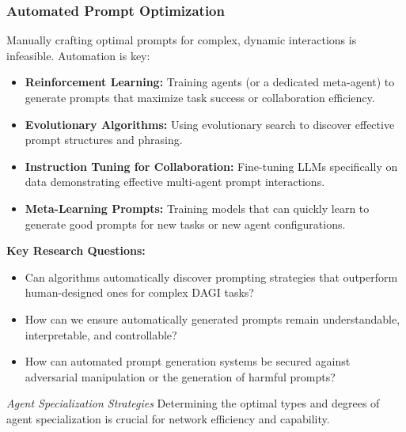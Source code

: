 \documentclass[12pt]{amsart}
\begin{document}
\subsubsection{Automated Prompt Optimization}
\label{subsubsec:automated_prompting}
Manually crafting optimal prompts for complex, dynamic interactions is infeasible. Automation is key:
\begin{itemize}[leftmargin=*]
    \item \textbf{Reinforcement Learning:} Training agents (or a dedicated meta-agent) to generate prompts that maximize task success or collaboration efficiency.
    \item \textbf{Evolutionary Algorithms:} Using evolutionary search to discover effective prompt structures and phrasing.
    \item \textbf{Instruction Tuning for Collaboration:} Fine-tuning LLMs specifically on data demonstrating effective multi-agent prompt interactions.
    \item \textbf{Meta-Learning Prompts:} Training models that can quickly learn to generate good prompts for new tasks or new agent configurations.
\end{itemize}
\textbf{Key Research Questions:}
\begin{itemize}[leftmargin=*, label={--}]
    \item Can algorithms automatically discover prompting strategies that outperform human-designed ones for complex DAGI tasks?
    \item How can we ensure automatically generated prompts remain understandable, interpretable, and controllable?
    \item How can automated prompt generation systems be secured against adversarial manipulation or the generation of harmful prompts?
\end{itemize}

 \textit{Agent Specialization Strategies} 
\label{subsec:agent_specialization}
Determining the optimal types and degrees of agent specialization is crucial for network efficiency and capability.
\end{document}
